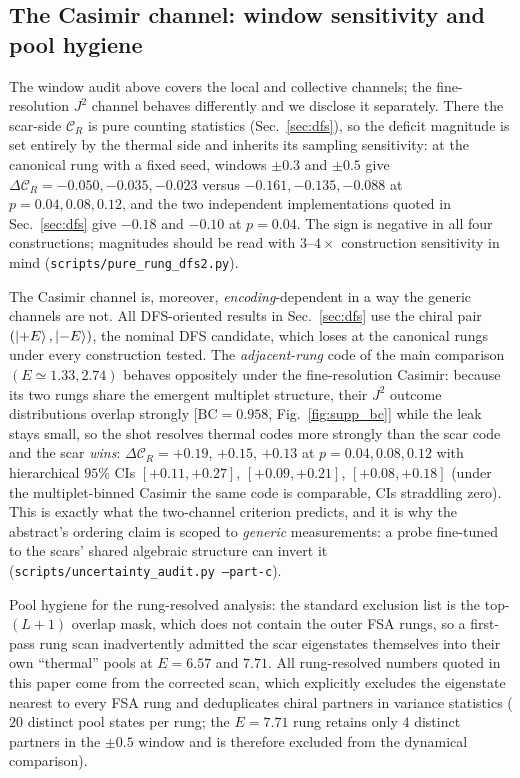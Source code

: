 \documentclass[aps,prb,twocolumn]{revtex4-2}
\newcommand{\CR}{\mathcal{C}_R}
\begin{document}
\subsection{The Casimir channel: window sensitivity and pool hygiene}
The window audit above covers the local and collective channels; the
fine-resolution $J^2$ channel behaves differently and we disclose it
separately. There the scar-side $\CR$ is pure counting statistics
(Sec.~\ref{sec:dfs}), so the deficit magnitude is set entirely by the
thermal side and inherits its sampling sensitivity: at the canonical rung
with a fixed seed, windows $\pm0.3$ and $\pm0.5$ give
$\Delta\CR=-0.050,-0.035,-0.023$ versus $-0.161,-0.135,-0.088$ at
$p=0.04,0.08,0.12$, and the two independent implementations quoted in
Sec.~\ref{sec:dfs} give $-0.18$ and $-0.10$ at $p=0.04$. The sign is
negative in all four constructions; magnitudes should be read with
$3$--$4\times$ construction sensitivity in mind
(\texttt{scripts/pure\_rung\_dfs2.py}).

The Casimir channel is, moreover, \emph{encoding}-dependent in a way the
generic channels are not. All DFS-oriented results in
Sec.~\ref{sec:dfs} use the chiral pair $(\ket{+E},\ket{-E})$, the nominal
DFS candidate, which loses at the canonical rungs under every construction
tested. The \emph{adjacent-rung} code of the main comparison
$(E\simeq1.33,2.74)$ behaves oppositely under the fine-resolution Casimir:
because its two rungs share the emergent multiplet structure, their $J^2$
outcome distributions overlap strongly
[$\mathrm{BC}=0.958$, Fig.~\ref{fig:supp_bc}] while the leak stays small,
so the shot resolves thermal codes more strongly than the scar code and the
scar \emph{wins}: $\Delta\CR=+0.19$, $+0.15$, $+0.13$ at $p=0.04,0.08,0.12$
with hierarchical $95\%$ CIs $[+0.11,+0.27]$, $[+0.09,+0.21]$,
$[+0.08,+0.18]$ (under the multiplet-binned Casimir the same code is
comparable, CIs straddling zero). This is exactly what the two-channel
criterion predicts, and it is why the abstract's ordering claim is scoped
to \emph{generic} measurements: a probe fine-tuned to the scars' shared
algebraic structure can invert it
(\texttt{scripts/uncertainty\_audit.py --part-c}).

Pool hygiene for the rung-resolved analysis: the standard exclusion list is
the top-$(L{+}1)$ overlap mask, which does not contain the outer FSA rungs,
so a first-pass rung scan inadvertently admitted the scar eigenstates
themselves into their own ``thermal'' pools at $E=6.57$ and $7.71$. All
rung-resolved numbers quoted in this paper come from the corrected scan,
which explicitly excludes the eigenstate nearest to every FSA rung and
deduplicates chiral partners in variance statistics ($20$ distinct pool
states per rung; the $E=7.71$ rung retains only $4$ distinct partners in
the $\pm0.5$ window and is therefore excluded from the dynamical
comparison).
\end{document}
